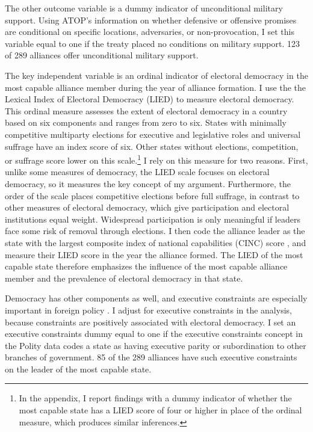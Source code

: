 \documentclass[12pt]{article}
\begin{document}
The other outcome variable is a dummy indicator of unconditional military support. 
Using ATOP's information on whether defensive or offensive promises are conditional on specific locations, adversaries, or non-provocation, I set this variable equal to one if the treaty placed no conditions on military support.
123 of 289 alliances offer unconditional military support. 


The key independent variable is an ordinal indicator of electoral democracy in the most capable alliance member during the year of alliance formation. 
I use the the Lexical Index of Electoral Democracy (LIED) \citep{Skaaningetal2015} to measure electoral democracy.
This ordinal measure assesses the extent of electoral democracy in a country based on six components and ranges from zero to six.  
States with minimally competitive multiparty elections for executive and legislative roles and universal suffrage have an index score of six.
Other states without elections, competition, or suffrage score lower on this scale.\footnote{In the appendix, I report findings with a dummy indicator of whether the most capable state has a LIED score of four or higher in place of the ordinal measure, which produces similar inferences.}
I rely on this measure for two reasons. 
First, unlike some measures of democracy, the LIED scale focuses on electoral democracy, so it measures the key concept of my argument.
Furthermore, the order of the scale places competitive elections before full suffrage, in contrast to other measures of electoral democracy, which give participation and electoral institutions equal weight. 
Widespread participation is only meaningful if leaders face some risk of removal through elections. 
I then code the alliance leader as the state with the largest composite index of national capabilities (CINC) score \citep{SingerCINC1988}, and measure their LIED score in the year the alliance formed.
The LIED of the most capable state therefore emphasizes the influence of the most capable alliance member and the prevalence of electoral democracy in that state.


Democracy has other components as well, and executive constraints are especially important in foreign policy \citep{MilnerTingley2015}. 
I adjust for executive constraints in the analysis, because constraints are positively associated with electoral democracy.
I set an executive constraints dummy equal to one if the executive constraints concept in the Polity data codes a state as having executive parity or subordination to other branches of government.
85 of the 289 alliances have such executive constraints on the leader of the most capable state.
\end{document}

